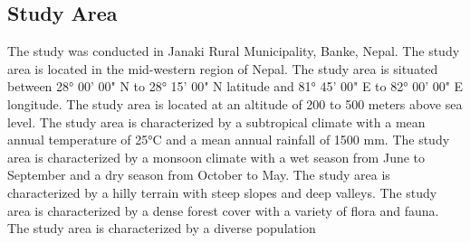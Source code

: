 \subsection{Study Area}

The study was conducted in Janaki Rural Municipality, Banke, Nepal. The study area is located in the mid-western region of Nepal. The study area is situated between 28° 00' 00" N to 28° 15' 00" N latitude and 81° 45' 00" E to 82° 00' 00" E longitude. The study area is located at an altitude of 200 to 500 meters above sea level. The study area is characterized by a subtropical climate with a mean annual temperature of 25°C and a mean annual rainfall of 1500 mm. The study area is characterized by a monsoon climate with a wet season from June to September and a dry season from October to May. The study area is characterized by a hilly terrain with steep slopes and deep valleys. The study area is characterized by a dense forest cover with a variety of flora and fauna. The study area is characterized by a diverse population



